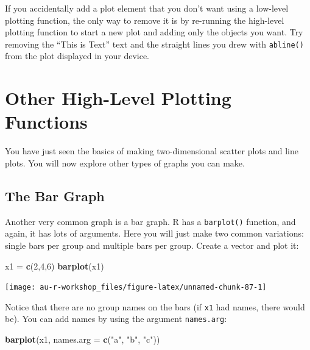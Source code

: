 \documentclass[]{book}
\newenvironment{Shaded}{\begin{snugshade}}{\end{snugshade}}
\newcommand{\KeywordTok}[1]{\textcolor[rgb]{0.13,0.29,0.53}{\textbf{#1}}}
\newcommand{\DataTypeTok}[1]{\textcolor[rgb]{0.13,0.29,0.53}{#1}}
\newcommand{\DecValTok}[1]{\textcolor[rgb]{0.00,0.00,0.81}{#1}}
\newcommand{\StringTok}[1]{\textcolor[rgb]{0.31,0.60,0.02}{#1}}
\newcommand{\NormalTok}[1]{#1}
\theoremstyle{definition}
\theoremstyle{definition}
\theoremstyle{definition}
\theoremstyle{remark}
\begin{document}
If you accidentally add a plot element that you don't want using a
low-level plotting function, the only way to remove it is by re-running
the high-level plotting function to start a new plot and adding only the
objects you want. Try removing the ``This is Text'' text and the
straight lines you drew with \texttt{abline()} from the plot displayed
in your device.

\section{Other High-Level Plotting
Functions}\label{other-high-level-plotting-functions}

You have just seen the basics of making two-dimensional scatter plots
and line plots. You will now explore other types of graphs you can make.

\subsection{The Bar Graph}\label{the-bar-graph}

Another very common graph is a bar graph. R has a \texttt{barplot()}
function, and again, it has lots of arguments. Here you will just make
two common variations: single bars per group and multiple bars per
group. Create a vector and plot it:

\begin{Shaded}
\begin{Highlighting}[]
\NormalTok{x1 =}\StringTok{ }\KeywordTok{c}\NormalTok{(}\DecValTok{2}\NormalTok{,}\DecValTok{4}\NormalTok{,}\DecValTok{6}\NormalTok{)}
\KeywordTok{barplot}\NormalTok{(x1)}
\end{Highlighting}
\end{Shaded}

\begin{center}\texttt{[image: au-r-workshop\_files/figure-latex/unnamed-chunk-87-1]} \end{center}

Notice that there are no group names on the bars (if \texttt{x1} had
names, there would be). You can add names by using the argument
\texttt{names.arg}:

\begin{Shaded}
\begin{Highlighting}[]
\KeywordTok{barplot}\NormalTok{(x1, }\DataTypeTok{names.arg =} \KeywordTok{c}\NormalTok{(}\StringTok{"a"}\NormalTok{, }\StringTok{"b"}\NormalTok{, }\StringTok{"c"}\NormalTok{))}
\end{Highlighting}
\end{Shaded}
\end{document}
